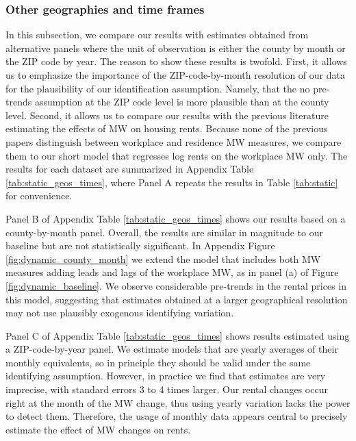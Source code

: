 \subsubsection*{Other geographies and time frames}

In this subsection, we compare our results with estimates obtained from 
alternative panels where the unit of observation is either the county by month 
or the ZIP code by year.
The reason to show these results is twofold.
First, it allows us to emphasize the importance of the ZIP-code-by-month 
resolution of our data for the plausibility of our identification assumption.
Namely, that the no pre-trends assumption at the ZIP code level is more 
plausible than at the county level.
Second, it allows us to compare our results with the previous literature 
estimating the effects of MW on housing rents.
Because none of the previous papers distinguish between workplace and residence
MW measures, we compare them to our short model that regresses log rents on
the workplace MW only.
The results for each dataset are summarized in Appendix Table 
\ref{tab:static_geos_times}, where Panel A repeats the results in Table 
\ref{tab:static} for convenience.

Panel B of Appendix Table \ref{tab:static_geos_times} shows our results based 
on a county-by-month panel.
Overall, the results are similar in magnitude to our baseline but are not
statistically significant.
In Appendix Figure \ref{fig:dynamic_county_month} we extend the model
that includes both MW measures adding leads and lags of the workplace MW, as
in panel (a) of Figure \ref{fig:dynamic_baseline}.
We observe considerable pre-trends in the rental prices in this model,
suggesting that estimates obtained at a larger geographical resolution may not 
use plausibly exogenous identifying variation.

Panel C of Appendix Table \ref{tab:static_geos_times} shows results estimated 
using a ZIP-code-by-year panel.
We estimate models that are yearly averages of their monthly equivalents, 
so in principle they should be valid under the same identifying assumption.
However, in practice we find that estimates are very imprecise, with standard
errors 3 to 4 times larger.
Our rental changes occur right at the month of the MW change, thus using 
yearly variation lacks the power to detect them.
Therefore, the usage of monthly data appears central to precisely estimate the 
effect of MW changes on rents.

%


